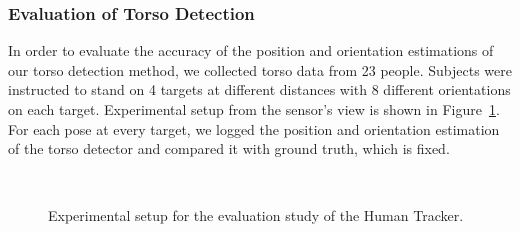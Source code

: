 \documentclass[12pt]{gatech-thesis}
\begin{document}
\subsubsection{Evaluation of Torso Detection}

In order to evaluate the accuracy of the position and orientation estimations of our torso detection method, we collected torso data from 23 people. Subjects were instructed to stand on 4 targets at different distances with 8 different orientations on each target. Experimental setup from the sensor's view is shown in Figure~\ref{fig:torso_tracking_exp_setup}. For each pose at every target, we logged the position and orientation estimation of the torso detector and compared it with ground truth, which is fixed.

\begin{figure}[h]
\centering
        \\ %
    \caption{%
	Experimental setup for the evaluation study of the Human Tracker.
     }%
   \label{fig:torso_tracking_exp_setup}
\end{figure}
\end{document}

